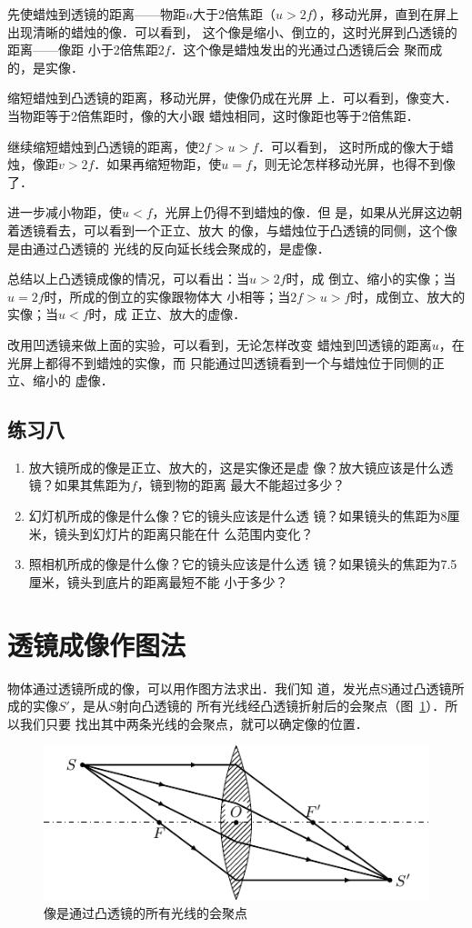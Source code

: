 先使蜡烛到透镜的距离——物距$u$大于2倍焦距（$u>
2f$），移动光屏，直到在屏上出现清晰的蜡烛的像．可以看到，
这个像是缩小、倒立的，这时光屏到凸透镜的距离——像距
小于2倍焦距$2f$．这个像是蜡烛发出的光通过凸透镜后会
聚而成的，是实像．

缩短蜡烛到凸透镜的距离，移动光屏，使像仍成在光屏
上．可以看到，像变大．当物距等于2倍焦距时，像的大小跟
蜡烛相同，这时像距也等于2倍焦距．

继续缩短蜡烛到凸透镜的距离，使$2f>u>f$．可以看到，
这时所成的像大于蜡烛，像距$v>2f$．如果再缩短物距，使$u=
f$，则无论怎样移动光屏，也得不到像了．

进一步减小物距，使$u<f$，光屏上仍得不到蜡烛的像．但
是，如果从光屏这边朝着透镜看去，可以看到一个正立、放大
的像，与蜡烛位于凸透镜的同侧，这个像是由通过凸透镜的
光线的反向延长线会聚成的，是虚像．

总结以上凸透镜成像的情况，可以看出：当$u>2f$时，成
倒立、缩小的实像；当$u=2f$时，所成的倒立的实像跟物体大
小相等；当$2f>u>f$时，成倒立、放大的实像；当$u<f$时，成
正立、放大的虚像．

改用凹透镜来做上面的实验，可以看到，无论怎样改变
蜡烛到凹透镜的距离$u$，在光屏上都得不到蜡烛的实像，而
只能通过凹透镜看到一个与蜡烛位于同侧的正立、缩小的
虚像．

\subsection*{练习八}
\begin{enumerate}
    \item 放大镜所成的像是正立、放大的，这是实像还是虚
像？放大镜应该是什么透镜？如果其焦距为$f$，镜到物的距离
最大不能超过多少？
\item 幻灯机所成的像是什么像？它的镜头应该是什么透
镜？如果镜头的焦距为8厘米，镜头到幻灯片的距离只能在什
么范围内变化？
\item 照相机所成的像是什么像？它的镜头应该是什么透
镜？如果镜头的焦距为7.5厘米，镜头到底片的距离最短不能
小于多少？
\end{enumerate}

\section{透镜成像作图法}
物体通过透镜所成的像，可以用作图方法求出．我们知
道，发光点S通过凸透镜所成的实像$S'$，是从$S$射向凸透镜的
所有光线经凸透镜折射后的会聚点（图~\ref{fig_C_5-39}）．所以我们只要
找出其中两条光线的会聚点，就可以确定像的位置．
\begin{figure}[htbp]
    \centering
    \includegraphics{fig/C/5-39.pdf}
    \caption{像是通过凸透镜的所有光线的会聚点}\label{fig_C_5-39}
\end{figure}


